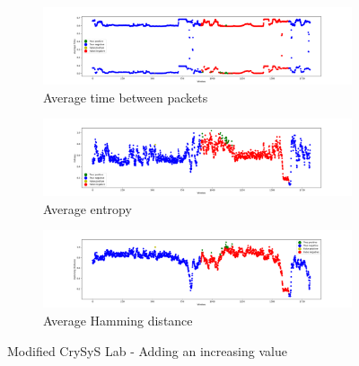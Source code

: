 \begin{figure}
    \centering
    \begin{subfigure}[b]{\linewidth}
        \includegraphics[width = \linewidth]{img/parts/app/tests/crysys/add_incr/AvgTime.png}
        \caption{Average time between packets}
        \label{subfig:extract_crysys_addincr_avgtime}
    \end{subfigure}
    \begin{subfigure}[b]{\linewidth}
        \includegraphics[width = \linewidth]{img/parts/app/tests/crysys/add_incr/Entropy.png}
        \caption{Average entropy}
        \label{subfig:extract_crysys_addincr_entropy}
    \end{subfigure}
    \begin{subfigure}[b]{\linewidth}
        \includegraphics[width = \linewidth]{img/parts/app/tests/crysys/add_incr/HammingDist.png}
        \caption{Average Hamming distance}
        \label{subfig:extract_crysys_addincr_hammingdist}
    \end{subfigure}
    \caption{Modified CrySyS Lab - Adding an increasing value}
    \label{fig:extract_crysys_addincr}
\end{figure}

